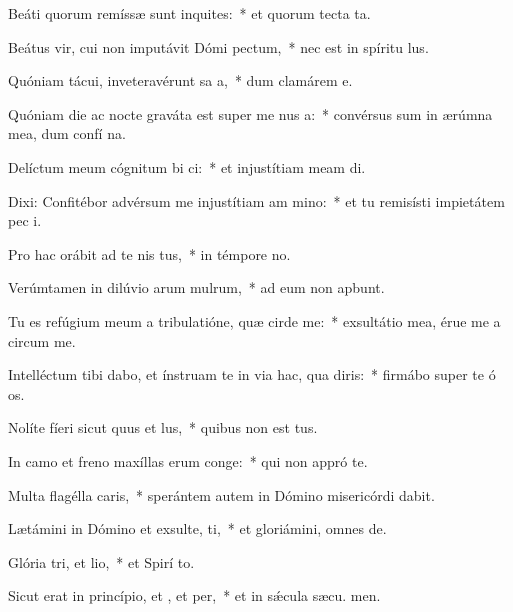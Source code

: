 \item Beáti quorum remíssæ sunt inquites:~* et quorum tecta  ta.
\item Beátus vir, cui non imputávit Dómi pectum,~* nec est in spíritu  lus.
\item Quóniam tácui, inveteravérunt sa a,~* dum clamárem  e.
\item Quóniam die ac nocte graváta est super me nus a:~* convérsus sum in ærúmna mea, dum confí na.
\item Delíctum meum cógnitum bi ci:~* et injustítiam meam  di.
\item Dixi: Confitébor advérsum me injustítiam am mino:~* et tu remisísti impietátem pec i.
\item Pro hac orábit ad te nis tus,~* in témpore no.
\item Verúmtamen in dilúvio arum mulrum,~* ad eum non apbunt.
\item Tu es refúgium meum a tribulatióne, quæ cirde me:~* exsultátio mea, érue me a circum me.
\item Intelléctum tibi dabo, et ínstruam te in via hac, qua diris:~* firmábo super te ó os.
\item Nolíte fíeri sicut quus et lus,~* quibus non est tus.
\item In camo et freno maxíllas erum conge:~* qui non appró  te.
\item Multa flagélla caris,~* sperántem autem in Dómino misericórdi dabit.
\item Lætámini in Dómino et exsulte, ti,~* et gloriámini, omnes  de.
\item Glória tri, et lio,~* et Spirí to.
\item Sicut erat in princípio, et , et per,~* et in sǽcula sæcu. men.
